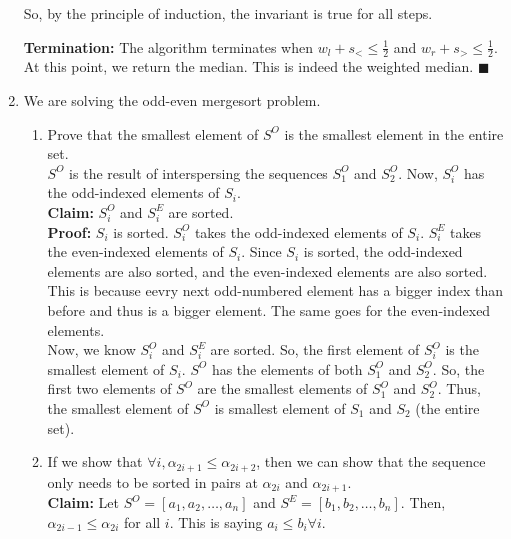 \documentclass[a4paper]{article}
\begin{document}
\begin{enumerate}
   So, by the principle of induction, the invariant is true for all steps.

   \textbf{Termination:} The algorithm terminates when $w_l + s_{<} \leq \frac{1}{2}$ and $w_r + s_{>} \leq \frac{1}{2}$. At this point, we return the median. This is indeed the weighted median. $\blacksquare$\\

   \newpage

   \item We are solving the odd-even mergesort problem.
   \begin{enumerate}
    \item Prove that the smallest element of $S^O$ is the smallest element in the entire set.\\
    
    $S^O$ is the result of interspersing the sequences $S_1^O$ and $S_2^O$. Now, $S_i^O$ has the odd-indexed elements of $S_i$.\\

    \textbf{Claim:} $S_i^O$ and $S_i^E$ are sorted.\\
    \textbf{Proof:} $S_i$ is sorted. $S_i^O$ takes the odd-indexed elements of $S_i$. $S_i^E$ takes the even-indexed elements of $S_i$. Since $S_i$ is sorted, the odd-indexed elements are also sorted, and the even-indexed elements are also sorted. This is because eevry next odd-numbered element has a bigger index than before and thus is a bigger element. The same goes for the even-indexed elements.\\

    Now, we know $S_i^O$ and $S_i^E$ are sorted. So, the first element of $S_i^O$ is the smallest element of $S_i$. $S^O$ has the elements of both $S_1^O$ and $S_2^O$. So, the first two elements of $S^O$ are the smallest elements of $S_1^O$ and $S_2^O$. Thus, the smallest element of $S^O$ is smallest element of $S_1$ and $S_2$ (the entire set).\\

    \item If we show that $\forall i, \alpha_{2i + 1} \leq \alpha_{2i + 2}$, then we can show that the sequence only needs to be sorted in pairs at $\alpha_{2i}$ and $\alpha_{2i + 1}$.\\
    
    \textbf{Claim:} Let $S^O = [a_1, a_2, \dots, a_n]$ and $S^E = [b_1, b_2, \dots, b_n]$. Then, $\alpha_{2i - 1} \leq \alpha_{2i}$ for all $i$. This is saying $a_i \leq b_i \forall i$.\\


\end{enumerate}
\end{enumerate}
\end{document}
